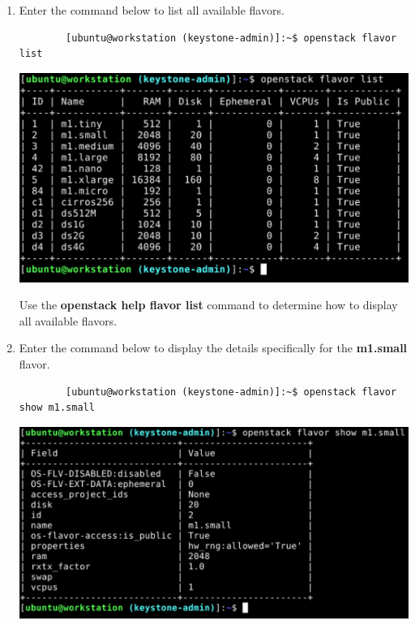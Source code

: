 \documentclass[letterpaper, 12pt]{article}
\begin{document}
\begin{enumerate}
    \item Enter the command below to list all available flavors.
    \begin{lstlisting}
        [ubuntu@workstation (keystone-admin)]:~$ openstack flavor list
    \end{lstlisting}

    \begin{center}
        \includegraphics[width=\linewidth]{images/part2/step9.png}
    \end{center}

    \begin{tipbox}
        Use the \textbf{openstack help flavor list} command to determine how to display all available flavors.
    \end{tipbox}

    \item Enter the command below to display the details specifically for the \textbf{m1.small} flavor.
    \begin{lstlisting}
        [ubuntu@workstation (keystone-admin)]:~$ openstack flavor show m1.small
    \end{lstlisting}

    \begin{center}
        \includegraphics[width=\linewidth]{images/part2/step10.png}
    \end{center}


\end{enumerate}
\end{document}
